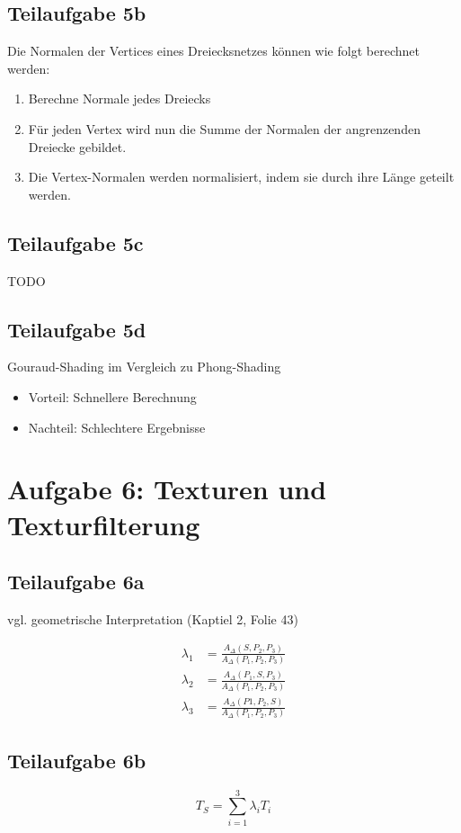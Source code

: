 \documentclass[a4paper]{scrartcl}
\begin{document}
\subsection*{Teilaufgabe 5b}
Die Normalen der Vertices eines Dreiecksnetzes können wie folgt berechnet werden:

\begin{enumerate}
    \item Berechne Normale jedes Dreiecks
    \item Für jeden Vertex wird nun die Summe der Normalen der angrenzenden Dreiecke gebildet.
    \item Die Vertex-Normalen werden normalisiert, indem sie durch ihre Länge geteilt werden.
\end{enumerate}

\subsection*{Teilaufgabe 5c}
TODO

\subsection*{Teilaufgabe 5d}
Gouraud-Shading im Vergleich zu Phong-Shading
\begin{itemize}
    \item Vorteil: Schnellere Berechnung
    \item Nachteil: Schlechtere Ergebnisse
\end{itemize}


\section*{Aufgabe 6: Texturen und Texturfilterung}
\subsection*{Teilaufgabe 6a}
vgl. geometrische Interpretation (Kaptiel 2, Folie 43)

\begin{align}
    \lambda_1 &= \frac{A_\Delta(S, P_2, P_3)}{A_\Delta(P_1, P_2, P_3)}\\
    \lambda_2 &= \frac{A_\Delta(P_1, S, P_3)}{A_\Delta(P_1, P_2, P_3)}\\
    \lambda_3 &= \frac{A_\Delta(P1, P_2, S)}{A_\Delta(P_1, P_2, P_3)}
\end{align}


\subsection*{Teilaufgabe 6b}
\[T_S = \sum_{i=1}^3 \lambda_i T_i\]
\end{document}
